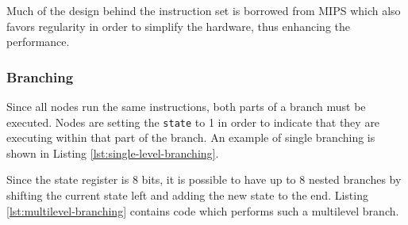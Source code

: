 Much of the design behind the instruction set is borrowed from MIPS which also
favors regularity in order to simplify the hardware, thus enhancing the
performance.

\subsubsection{Branching}
Since all nodes run the same instructions, both parts of a branch must be
executed. Nodes are setting the {\tt state} to 1 in order to indicate that they
are executing within that part of the branch. An example of single branching is
shown in Listing \ref{lst:single-level-branching}.



Since the state register is 8 bits, it is possible to have up to 8 nested
branches by shifting the current state left and adding the new state to the
end. Listing \ref{lst:multilevel-branching} contains code which performs such a
multilevel branch.



